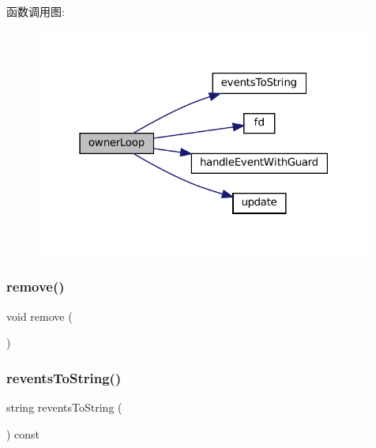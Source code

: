 函数调用图\+:
\nopagebreak
\begin{figure}[H]
\begin{center}
\leavevmode
\includegraphics[width=315pt]{classmuduo_1_1net_1_1Channel_a2e24e2ab7ada4682fdf49cc835d85e8d_cgraph}
\end{center}
\end{figure}
\mbox{\label{classmuduo_1_1net_1_1Channel_a1fcb45e5d2428352eb36b487d1d4eea3}} 
\subsubsection{\texorpdfstring{remove()}{remove()}}
{\footnotesize\ttfamily void remove (\begin{DoxyParamCaption}{ }\end{DoxyParamCaption})}

\mbox{\label{classmuduo_1_1net_1_1Channel_a999f712b429fc3bef932df5198f93ad7}} 
\subsubsection{\texorpdfstring{revents\+To\+String()}{reventsToString()}}
{\footnotesize\ttfamily string revents\+To\+String (\begin{DoxyParamCaption}{ }\end{DoxyParamCaption}) const}



